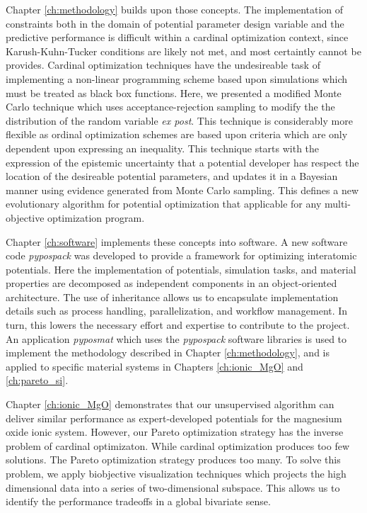Chapter \ref{ch:methodology} builds upon those concepts.  The implementation of constraints both in the domain of potential parameter design variable and the predictive performance is difficult within a cardinal optimization context, since Karush-Kuhn-Tucker conditions are likely not met, and most certaintly cannot be provides.  Cardinal optimization techniques have the undesireable task of implementing a non-linear programming scheme based upon simulations which must be treated as black box functions.  Here, we presented a modified Monte Carlo technique which uses acceptance-rejection sampling to modify the the distribution of the random variable \emph{ex post}.  This technique is considerably more flexible as ordinal optimization schemes are based upon criteria which are only dependent upon expressing an inequality.  This technique starts with the expression of the epistemic uncertainty that a potential developer has respect the location of the desireable potential parameters, and updates it in a Bayesian manner using evidence generated from Monte Carlo sampling.  This defines a new evolutionary algorithm for potential optimization that applicable for any multi-objective optimization program.

Chapter \ref{ch:software} implements these concepts into software.  A new software code \emph{pypospack} was developed to provide a framework for optimizing interatomic potentials.  Here the implementation of potentials, simulation tasks, and material properties are decomposed as independent components in an object-oriented architecture.  The use of inheritance allows us to encapsulate implementation details such as process handling, parallelization, and workflow management.  In turn, this lowers the necessary effort and expertise to contribute to the project.  An application \emph{pyposmat} which uses the \emph{pypospack} software libraries is used to implement the methodology described in Chapter \ref{ch:methodology}, and is applied to specific material systems in Chapters \ref{ch:ionic_MgO} and \ref{ch:pareto_si}.

Chapter \ref{ch:ionic_MgO} demonstrates that our unsupervised algorithm can deliver similar performance as expert-developed potentials for the magnesium oxide ionic system.  However, our Pareto optimization strategy has the inverse problem of cardinal optimizaton.  While cardinal optimization produces too few solutions.  The Pareto optimization strategy produces too many.  To solve this problem, we apply biobjective visualization techniques which projects the high dimensional data into a series of two-dimensional subspace.  This allows us to identify the performance tradeoffs in a global bivariate sense.

